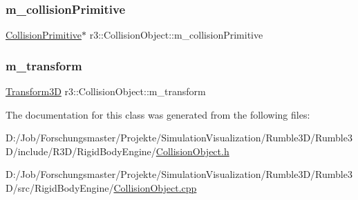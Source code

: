 \subsubsection{\texorpdfstring{m\+\_\+collision\+Primitive}{m\_collisionPrimitive}}
{\footnotesize\ttfamily \mbox{\hyperlink{classr3_1_1_collision_primitive}{Collision\+Primitive}}$\ast$ r3\+::\+Collision\+Object\+::m\+\_\+collision\+Primitive\hspace{0.3cm}{\ttfamily [protected]}}

\mbox{\label{classr3_1_1_collision_object_a2ed717150a250f1b81e23ba7e5431542}} 
\subsubsection{\texorpdfstring{m\+\_\+transform}{m\_transform}}
{\footnotesize\ttfamily \mbox{\hyperlink{classr3_1_1_transform3_d}{Transform3D}} r3\+::\+Collision\+Object\+::m\+\_\+transform\hspace{0.3cm}{\ttfamily [protected]}}



The documentation for this class was generated from the following files\+:\begin{DoxyCompactItemize}
\item 
D\+:/\+Job/\+Forschungsmaster/\+Projekte/\+Simulation\+Visualization/\+Rumble3\+D/\+Rumble3\+D/include/\+R3\+D/\+Rigid\+Body\+Engine/\mbox{\hyperlink{_collision_object_8h}{Collision\+Object.\+h}}\item 
D\+:/\+Job/\+Forschungsmaster/\+Projekte/\+Simulation\+Visualization/\+Rumble3\+D/\+Rumble3\+D/src/\+Rigid\+Body\+Engine/\mbox{\hyperlink{_collision_object_8cpp}{Collision\+Object.\+cpp}}\end{DoxyCompactItemize}
